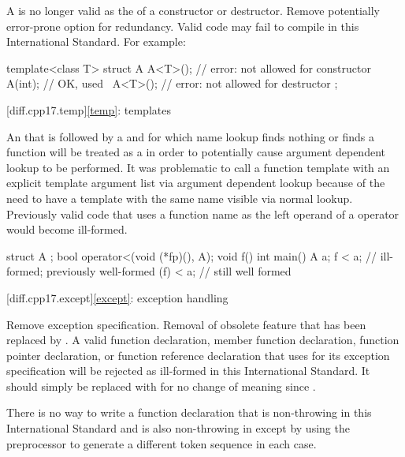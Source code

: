 \change
A 
is no longer valid as the  of a constructor or destructor.
\rationale
Remove potentially error-prone option for redundancy.
\effect
Valid \CppXVII{} code may fail to compile
in this International Standard. For example:
\begin{codeblock}
template<class T>
struct A {
  A<T>();          // error:  not allowed for constructor
  A(int);          // OK,  used
  ~A<T>();         // error:  not allowed for destructor
};
\end{codeblock}

[diff.cpp17.temp]{\ref{temp}: templates}

\change
An 
that is followed by a \tcode{<}
and for which name lookup
finds nothing or finds a function
will be treated as a 
in order to potentially cause argument dependent lookup to be performed.
\rationale
It was problematic to call a function template
with an explicit template argument list
via argument dependent lookup
because of the need to have a template with the same name
visible via normal lookup.
\effect
Previously valid code that uses a function name
as the left operand of a \tcode{<} operator
would become ill-formed.
\begin{codeblock}
struct A {};
bool operator<(void (*fp)(), A);
void f() {}
int main() {
  A a;
  f < a;    // ill-formed; previously well-formed
  (f) < a;  // still well formed
}
\end{codeblock}

[diff.cpp17.except]{\ref{except}: exception handling}

\change Remove  exception specification.
\rationale
Removal of obsolete feature that has been replaced by .
\effect
A valid \CppXVII{} function declaration, member function declaration, function
pointer declaration, or function reference declaration that uses 
for its exception specification will be rejected as ill-formed in this
International Standard. It should simply be replaced with  for no
change of meaning since \CppXVII{}.
\begin{note}
There is no way to write a function declaration
that is non-throwing in this International Standard
and is also non-throwing in \CppIII{}
except by using the preprocessor to generate
a different token sequence in each case.
\end{note}

